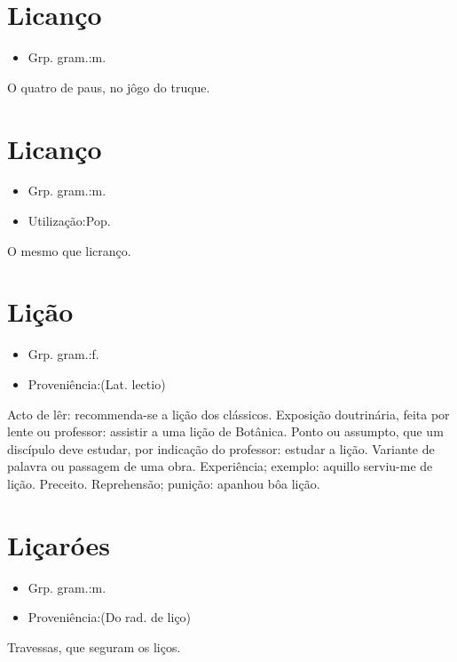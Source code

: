 \section{Licanço}
\begin{itemize}
\item {Grp. gram.:m.}
\end{itemize}
O quatro de paus, no jôgo do truque.
\section{Licanço}
\begin{itemize}
\item {Grp. gram.:m.}
\end{itemize}
\begin{itemize}
\item {Utilização:Pop.}
\end{itemize}
O mesmo que \textunderscore licranço\textunderscore .
\section{Lição}
\begin{itemize}
\item {Grp. gram.:f.}
\end{itemize}
\begin{itemize}
\item {Proveniência:(Lat. \textunderscore lectio\textunderscore )}
\end{itemize}
Acto de lêr: \textunderscore recommenda-se a lição dos clássicos\textunderscore .
Exposição doutrinária, feita por lente ou professor: \textunderscore assistir a uma lição de Botânica\textunderscore .
Ponto ou assumpto, que um discípulo deve estudar, por indicação do professor: \textunderscore estudar a lição\textunderscore .
Variante de palavra ou passagem de uma obra.
Experiência; exemplo: \textunderscore aquillo serviu-me de lição\textunderscore .
Preceito.
Reprehensão; punição: \textunderscore apanhou bôa lição\textunderscore .
\section{Liçaróes}
\begin{itemize}
\item {Grp. gram.:m.}
\end{itemize}
\begin{itemize}
\item {Proveniência:(Do rad. de \textunderscore liço\textunderscore )}
\end{itemize}
Travessas, que seguram os liços.
